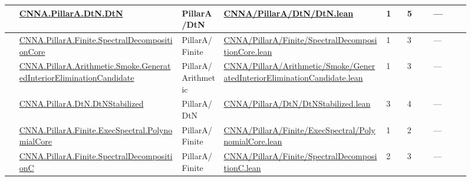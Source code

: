 \begin{longtable}{L{0.025\linewidth} L{0.315\linewidth} L{0.08\linewidth} L{0.315\linewidth} L{0.045\linewidth} L{0.055\linewidth} L{0.07\linewidth}}
\hline
{} & \href{run:repo_snapshot/CNNA/PillarA/DtN/DtN.lean}{CNNA.\allowbreak{}PillarA.\allowbreak{}DtN.\allowbreak{}DtN} & PillarA/\allowbreak{}DtN & \href{run:repo_snapshot/CNNA/PillarA/DtN/DtN.lean}{CNNA/\allowbreak{}PillarA/\allowbreak{}DtN/\allowbreak{}DtN.\allowbreak{}lean} & 1 & 5 & ---\\
\hline
{} & \href{run:repo_snapshot/CNNA/PillarA/Finite/SpectralDecompositionCore.lean}{CNNA.\allowbreak{}PillarA.\allowbreak{}Finite.\allowbreak{}SpectralDecompositionCore} & PillarA/\allowbreak{}Finite & \href{run:repo_snapshot/CNNA/PillarA/Finite/SpectralDecompositionCore.lean}{CNNA/\allowbreak{}PillarA/\allowbreak{}Finite/\allowbreak{}SpectralDecompositionCore.\allowbreak{}lean} & 1 & 3 & ---\\
\hline
{} & \href{run:repo_snapshot/CNNA/PillarA/Arithmetic/Smoke/GeneratedInteriorEliminationCandidate.lean}{CNNA.\allowbreak{}PillarA.\allowbreak{}Arithmetic.\allowbreak{}Smoke.\allowbreak{}GeneratedInteriorEliminationCandidate} & PillarA/\allowbreak{}Arithmetic & \href{run:repo_snapshot/CNNA/PillarA/Arithmetic/Smoke/GeneratedInteriorEliminationCandidate.lean}{CNNA/\allowbreak{}PillarA/\allowbreak{}Arithmetic/\allowbreak{}Smoke/\allowbreak{}GeneratedInteriorEliminationCandidate.\allowbreak{}lean} & 1 & 3 & ---\\
\hline
{} & \href{run:repo_snapshot/CNNA/PillarA/DtN/DtNStabilized.lean}{CNNA.\allowbreak{}PillarA.\allowbreak{}DtN.\allowbreak{}DtNStabilized} & PillarA/\allowbreak{}DtN & \href{run:repo_snapshot/CNNA/PillarA/DtN/DtNStabilized.lean}{CNNA/\allowbreak{}PillarA/\allowbreak{}DtN/\allowbreak{}DtNStabilized.\allowbreak{}lean} & 3 & 4 & ---\\
\hline
{} & \href{run:repo_snapshot/CNNA/PillarA/Finite/ExecSpectral/PolynomialCore.lean}{CNNA.\allowbreak{}PillarA.\allowbreak{}Finite.\allowbreak{}ExecSpectral.\allowbreak{}PolynomialCore} & PillarA/\allowbreak{}Finite & \href{run:repo_snapshot/CNNA/PillarA/Finite/ExecSpectral/PolynomialCore.lean}{CNNA/\allowbreak{}PillarA/\allowbreak{}Finite/\allowbreak{}ExecSpectral/\allowbreak{}PolynomialCore.\allowbreak{}lean} & 1 & 2 & ---\\
\hline
{} & \href{run:repo_snapshot/CNNA/PillarA/Finite/SpectralDecompositionC.lean}{CNNA.\allowbreak{}PillarA.\allowbreak{}Finite.\allowbreak{}SpectralDecompositionC} & PillarA/\allowbreak{}Finite & \href{run:repo_snapshot/CNNA/PillarA/Finite/SpectralDecompositionC.lean}{CNNA/\allowbreak{}PillarA/\allowbreak{}Finite/\allowbreak{}SpectralDecompositionC.\allowbreak{}lean} & 2 & 3 & ---\\

\end{longtable}
